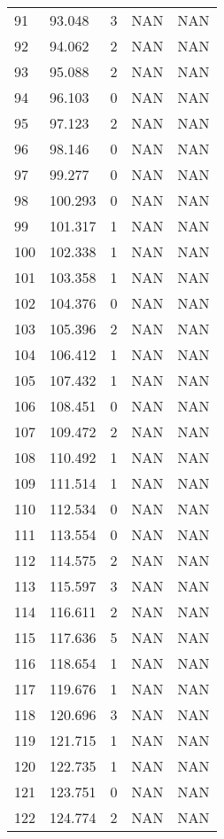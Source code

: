\documentclass{article}
\begin{document}
\begin{longtable}{@{}lllll@{}}
				91  & 93.048  & 3    & NAN  & NAN  \\
				92  & 94.062  & 2    & NAN  & NAN  \\
				93  & 95.088  & 2    & NAN  & NAN  \\
				94  & 96.103  & 0    & NAN  & NAN  \\
				95  & 97.123  & 2    & NAN  & NAN  \\
				96  & 98.146  & 0    & NAN  & NAN  \\
				97  & 99.277  & 0    & NAN  & NAN  \\
				98  & 100.293 & 0    & NAN  & NAN  \\
				99  & 101.317 & 1    & NAN  & NAN  \\
				100 & 102.338 & 1    & NAN  & NAN  \\
				101 & 103.358 & 1    & NAN  & NAN  \\
				102 & 104.376 & 0    & NAN  & NAN  \\
				103 & 105.396 & 2    & NAN  & NAN  \\
				104 & 106.412 & 1    & NAN  & NAN  \\
				105 & 107.432 & 1    & NAN  & NAN  \\
				106 & 108.451 & 0    & NAN  & NAN  \\
				107 & 109.472 & 2    & NAN  & NAN  \\
				108 & 110.492 & 1    & NAN  & NAN  \\
				109 & 111.514 & 1    & NAN  & NAN  \\
				110 & 112.534 & 0    & NAN  & NAN  \\
				111 & 113.554 & 0    & NAN  & NAN  \\
				112 & 114.575 & 2    & NAN  & NAN  \\
				113 & 115.597 & 3    & NAN  & NAN  \\
				114 & 116.611 & 2    & NAN  & NAN  \\
				115 & 117.636 & 5    & NAN  & NAN  \\
				116 & 118.654 & 1    & NAN  & NAN  \\
				117 & 119.676 & 1    & NAN  & NAN  \\
				118 & 120.696 & 3    & NAN  & NAN  \\
				119 & 121.715 & 1    & NAN  & NAN  \\
				120 & 122.735 & 1    & NAN  & NAN  \\
				121 & 123.751 & 0    & NAN  & NAN  \\
				122 & 124.774 & 2    & NAN  & NAN  \\

\end{longtable}
\end{document}
